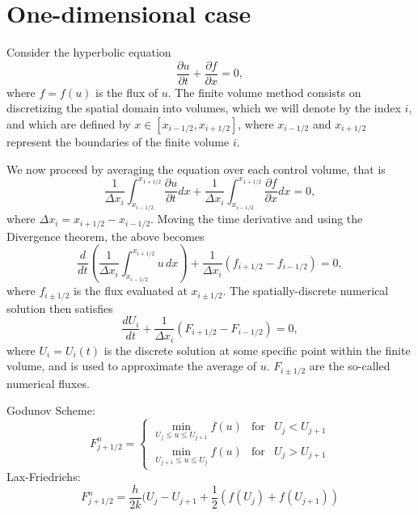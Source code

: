 \documentclass[oneside,a4paper,11pt]{report}
\begin{document}
\section{One-dimensional case}
Consider the hyperbolic equation
\begin{equation}
\frac{\partial u}{\partial t} + \frac{\partial f}{\partial x} = 0,
\end{equation}
where $f = f(u)$ is the flux of $u$. The finite volume method consists on discretizing the spatial domain into volumes, which we will denote by the index $i$, and which are defined by $x \in [x_{i-1/2}, x_{i+1/2}]$, where $x_{i-1/2}$ and $x_{i+1/2}$ represent the boundaries of the finite volume $i$.

We now proceed by averaging the equation over each control volume, that is
\begin{equation}
\frac{1}{\Delta x_i} \int_{x_{i-1/2}}^{x_{1+1/2}} \frac{\partial u}{\partial t} dx + \frac{1}{\Delta x_i} \int_{x_{i-1/2}}^{x_{1+1/2}} \frac{\partial f}{\partial x} dx = 0,
\end{equation}
where $\Delta x_i = x_{i+1/2} - x_{i-1/2}$. Moving the time derivative and using the Divergence theorem, the above becomes
\begin{equation}
\frac{d}{d t} \left( \frac{1}{\Delta x_i} \int_{x_{i-1/2}}^{x_{i+1/2}} u \,dx \right) + \frac{1}{\Delta x_i} ( f_{i+1/2} - f_{i-1/2} ) = 0,
\end{equation}
where $f_{i \pm 1/2}$ is the flux evaluated at $x_{i \pm 1/2}$. The spatially-discrete numerical solution then satisfies 
\begin{equation}
\frac{d U_i}{dt} + \frac{1}{\Delta x_i} ( F_{i+1/2} - F_{i-1/2} ) = 0,
\end{equation}
where $U_i = U_i(t)$ is the discrete solution at some specific point within the finite volume, and is used to approximate the average of $u$. $F_{i \pm 1/2}$ are the so-called numerical fluxes.

Godunov Scheme:
$$ F_{j+1/2}^n = \left\{ \begin{array}{lll}  \min_{U_j \le u \le U_{j+1}} f(u) & \text{for} & U_j < U_{j+1}\\
                                                                               \min_{U_{j+1} \le u \le U_j} f(u) & \text{for} & U_j > U_{j+1} \end{array}\right. $$
Lax-Friedrichs:
$$F_{j+1/2}^n = \frac{h}{2k}(U_j-U_{j+1}+\frac{1}{2}(f(U_j)+f(U_{j+1}))$$                                                                               
\end{document}
